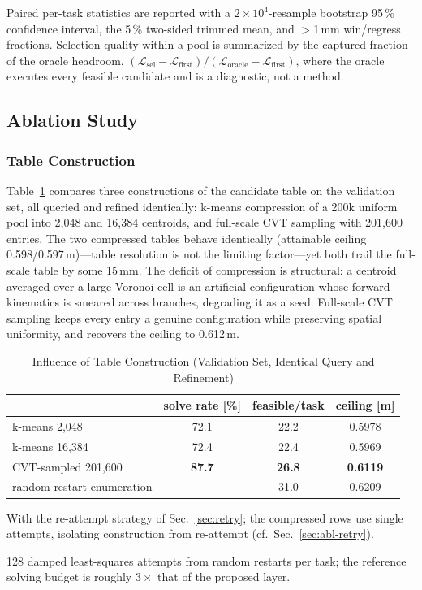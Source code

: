 \documentclass[journal]{IEEEtran}
\begin{document}
Paired per-task statistics are reported with a
$2{\times}10^{4}$-resample bootstrap 95\,\% confidence interval, the
5\,\% two-sided trimmed mean, and $>$1\,mm win/regress fractions.
Selection quality within a pool is summarized by the captured fraction
of the oracle headroom,
$(\mathcal{L}_{\mathrm{sel}}-\mathcal{L}_{\mathrm{first}})/
 (\mathcal{L}_{\mathrm{oracle}}-\mathcal{L}_{\mathrm{first}})$, where
the oracle executes every feasible candidate and is a diagnostic, not a
method.

\subsection{Ablation Study}

\subsubsection{Table Construction}
\label{sec:abl-table}
Table~\ref{tab:table-abl} compares three constructions of the candidate
table on the validation set, all queried and refined identically:
k-means compression of a 200k uniform pool into 2{,}048 and 16{,}384
centroids, and full-scale CVT sampling with 201{,}600 entries. The two
compressed tables behave identically (attainable ceiling
0.598/0.597\,m)---table resolution is not the limiting factor---yet both
trail the full-scale table by some 15\,mm. The deficit of compression is
structural: a centroid averaged over a large Voronoi cell is an
artificial configuration whose forward kinematics is smeared across
branches, degrading it as a seed. Full-scale CVT sampling keeps every
entry a genuine configuration while preserving spatial uniformity, and
recovers the ceiling to 0.612\,m.

\begin{table}[!t]
\caption{Influence of Table Construction (Validation Set,
Identical Query and Refinement)}
\label{tab:table-abl}
\centering
\footnotesize
\begin{threeparttable}
\begin{tabular}{lccc}
\toprule
 & solve rate [\%] & feasible/task & ceiling [m] \\
\midrule
k-means 2{,}048 & 72.1 & 22.2 & 0.5978 \\
k-means 16{,}384 & 72.4 & 22.4 & 0.5969 \\
CVT-sampled 201{,}600 & \textbf{87.7}\tnote{1} & \textbf{26.8} &
\textbf{0.6119} \\
\midrule
random-restart enumeration\tnote{2} & --- & 31.0 & 0.6209 \\
\bottomrule
\end{tabular}
\begin{tablenotes}
\item[1] With the re-attempt strategy of Sec.~\ref{sec:retry}; the
compressed rows use single attempts, isolating construction from
re-attempt (cf.\ Sec.~\ref{sec:abl-retry}).
\item[2] 128 damped least-squares attempts from random restarts per
task; the reference solving budget is roughly $3\times$ that of the
proposed layer.
\end{tablenotes}
\end{threeparttable}
\end{table}
\end{document}
